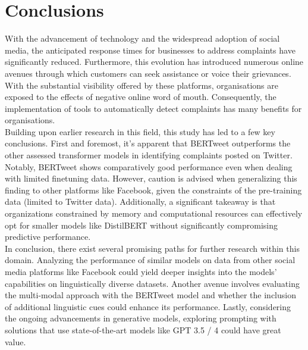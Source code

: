 \chapter{Conclusions}

With the advancement of technology and the widespread adoption of social media, the anticipated response times for businesses to address complaints have significantly reduced. Furthermore, this evolution has introduced numerous online avenues through which customers can seek assistance or voice their grievances. With the substantial visibility offered by these platforms, organisations are exposed to the effects of negative online word of mouth. Consequently, the implementation of tools to automatically detect complaints has many benefits for organisations.\\

Building upon earlier research in this field, this study has led to a few key conclusions. First and foremost, it's apparent that BERTweet outperforms the other assessed transformer models in identifying complaints posted on Twitter. Notably, BERTweet shows comparatively good performance even when dealing with limited finetuning data. However, caution is advised when generalizing this finding to other platforms like Facebook, given the constraints of the pre-training data (limited to Twitter data). Additionally, a significant takeaway is that organizations constrained by memory and computational resources can effectively opt for smaller models like DistilBERT without significantly compromising predictive performance.\\

In conclusion, there exist several promising paths for further research within this domain. Analyzing the performance of similar models on data from other social media platforms like Facebook could yield deeper insights into the models' capabilities on linguistically diverse datasets. Another avenue involves evaluating the multi-modal approach with the BERTweet model and whether the inclusion of additional linguistic cues could enhance its performance. Lastly, considering the ongoing advancements in generative models, exploring prompting with solutions that use state-of-the-art models like GPT 3.5 / 4 could have great value.
